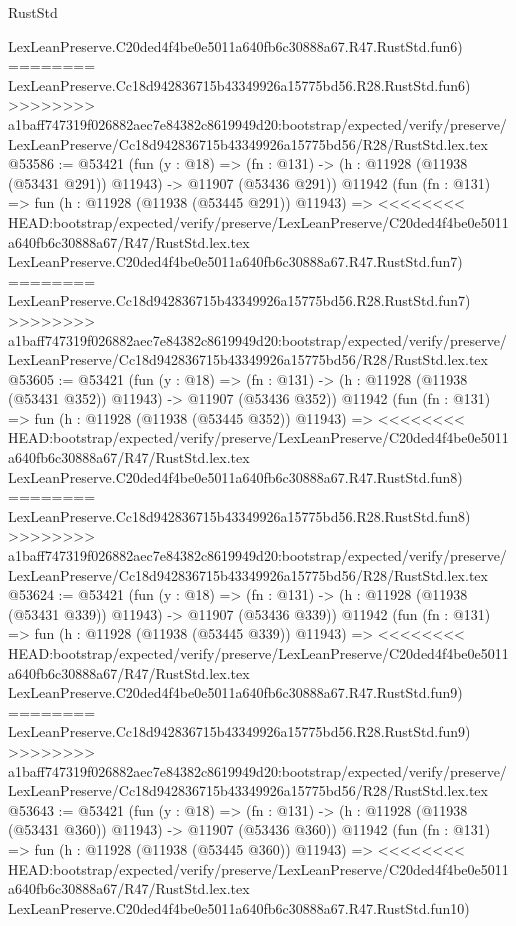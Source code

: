 \begin{lexlean}{RustStd}
\begin{coremodule}
{\begin{coremodule}
{{{{{{{{{{{{{{{{{{{{{{{{{{{{{{{{{{{{{{{{{{{{{{{{{{{{{{{{{{{{{{{{{{{{{{{{{{{{{{{{    LexLeanPreserve.C20ded4f4be0e5011a640fb6c30888a67.R47.RustStd.fun6)
========
    LexLeanPreserve.Cc18d942836715b43349926a15775bd56.R28.RustStd.fun6)
>>>>>>>> a1baff747319f026882aec7e84382c8619949d20:bootstrap/expected/verify/preserve/LexLeanPreserve/Cc18d942836715b43349926a15775bd56/R28/RustStd.lex.tex
@53586 := @53421
    (fun (y : @18) =>
    (fn : @131) -> (h : @11928 (@11938 (@53431 @291)) @11943) -> @11907 (@53436 @291))
    @11942
    (fun (fn : @131) =>
    fun (h : @11928 (@11938 (@53445 @291)) @11943) =>
<<<<<<<< HEAD:bootstrap/expected/verify/preserve/LexLeanPreserve/C20ded4f4be0e5011a640fb6c30888a67/R47/RustStd.lex.tex
    LexLeanPreserve.C20ded4f4be0e5011a640fb6c30888a67.R47.RustStd.fun7)
========
    LexLeanPreserve.Cc18d942836715b43349926a15775bd56.R28.RustStd.fun7)
>>>>>>>> a1baff747319f026882aec7e84382c8619949d20:bootstrap/expected/verify/preserve/LexLeanPreserve/Cc18d942836715b43349926a15775bd56/R28/RustStd.lex.tex
@53605 := @53421
    (fun (y : @18) =>
    (fn : @131) -> (h : @11928 (@11938 (@53431 @352)) @11943) -> @11907 (@53436 @352))
    @11942
    (fun (fn : @131) =>
    fun (h : @11928 (@11938 (@53445 @352)) @11943) =>
<<<<<<<< HEAD:bootstrap/expected/verify/preserve/LexLeanPreserve/C20ded4f4be0e5011a640fb6c30888a67/R47/RustStd.lex.tex
    LexLeanPreserve.C20ded4f4be0e5011a640fb6c30888a67.R47.RustStd.fun8)
========
    LexLeanPreserve.Cc18d942836715b43349926a15775bd56.R28.RustStd.fun8)
>>>>>>>> a1baff747319f026882aec7e84382c8619949d20:bootstrap/expected/verify/preserve/LexLeanPreserve/Cc18d942836715b43349926a15775bd56/R28/RustStd.lex.tex
@53624 := @53421
    (fun (y : @18) =>
    (fn : @131) -> (h : @11928 (@11938 (@53431 @339)) @11943) -> @11907 (@53436 @339))
    @11942
    (fun (fn : @131) =>
    fun (h : @11928 (@11938 (@53445 @339)) @11943) =>
<<<<<<<< HEAD:bootstrap/expected/verify/preserve/LexLeanPreserve/C20ded4f4be0e5011a640fb6c30888a67/R47/RustStd.lex.tex
    LexLeanPreserve.C20ded4f4be0e5011a640fb6c30888a67.R47.RustStd.fun9)
========
    LexLeanPreserve.Cc18d942836715b43349926a15775bd56.R28.RustStd.fun9)
>>>>>>>> a1baff747319f026882aec7e84382c8619949d20:bootstrap/expected/verify/preserve/LexLeanPreserve/Cc18d942836715b43349926a15775bd56/R28/RustStd.lex.tex
@53643 := @53421
    (fun (y : @18) =>
    (fn : @131) -> (h : @11928 (@11938 (@53431 @360)) @11943) -> @11907 (@53436 @360))
    @11942
    (fun (fn : @131) =>
    fun (h : @11928 (@11938 (@53445 @360)) @11943) =>
<<<<<<<< HEAD:bootstrap/expected/verify/preserve/LexLeanPreserve/C20ded4f4be0e5011a640fb6c30888a67/R47/RustStd.lex.tex
    LexLeanPreserve.C20ded4f4be0e5011a640fb6c30888a67.R47.RustStd.fun10)
}}}}}}}}}}}}}}}}}}}}}}}}}}}}}}}}}}}}}}}}}}}}}}}}}}}}}}}}}}}}}}}}}}}}}}}}}}}}}}}}
\end{coremodule}}
\end{coremodule}
\end{lexlean}

